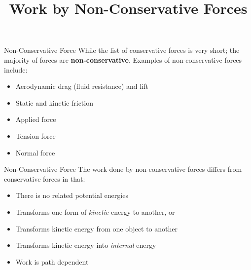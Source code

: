 \documentclass[12pt,compress,aspectratio=169]{beamer}
\title{Work by Non-Conservative Forces}
\date{}
\begin{document}
\begin{frame}
  \maketitle
\end{frame}




\begin{frame}{Non-Conservative Force}
  While the list of conservative forces is very short; the majority of forces
  are \textbf{non-conservative}. Examples of non-conservative forces include:
  \begin{itemize}
  \item Aerodynamic drag (fluid resistance) and lift
  \item Static and kinetic friction
  \item Applied force
  \item Tension force
  \item Normal force
  \end{itemize}
\end{frame}



\begin{frame}{Non-Conservative Force}
  The work done by non-conservative forces differs from conservative forces in
  that:
  \begin{itemize}
  \item There is no related potential energies
  \item Transforms one form of \emph{kinetic} energy to another, or
  \item Transforms kinetic energy from one object to another
  \item Transforms kinetic energy into \emph{internal} energy
  \item Work is path dependent
  \end{itemize}
\end{frame}
\end{document}
